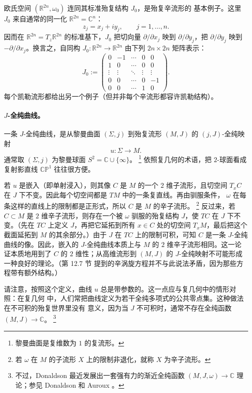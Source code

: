 欧氏空间 $(\mathbb R^{2n},\omega_0)$ 连同其标准殆复结构 $J_0$，是殆复辛流形的
基本例子。这里 $J_0$ 来自通常的同一化 $\mathbb R^{2n}=\mathbb C^n$：
\[
  z_j=x_j+iy_j,\qquad j=1,\dots,n.
\]
因而在 $\mathbb R^{2n}=T_z\mathbb R^{2n}$ 的标准基下，$J_0$ 把切向量
$\partial/\partial x_j$ 映到 $\partial/\partial y_j$，把
$\partial/\partial y_j$ 映到 $-\partial/\partial x_j$。换言之，自同构
$J_0:\mathbb R^{2n}\to\mathbb R^{2n}$ 由下列 $2n\times2n$ 矩阵表示：
\[
J_0:=
\begin{pmatrix}
0&-1&\cdots&0&0\\
1&0&\cdots&0&0\\
\vdots&\vdots&\ddots&\vdots&\vdots\\
0&0&\cdots&0&-1\\
0&0&\cdots&1&0
\end{pmatrix}.
\]
每个凯勒流形都给出另一个例子（但并非每个辛流形都容许凯勒结构）。

\paragraph{$J$-全纯曲线。}
一条 $J$-全纯曲线，是从黎曼曲面 $(\Sigma,j)$ 到殆复流形 $(M,J)$ 的
$(j,J)$-全纯映射
\[
  u:\Sigma\to M.
\]
通常取 $(\Sigma,j)$ 为黎曼球面 $S^2=\mathbb C\cup\{\infty\}$。
\footnote{黎曼曲面是复维数为 $1$ 的复流形。}
依照复几何的术语，把 $2$-球面看成复射影直线 $\mathbb{CP}^1$ 往往很方便。

若 $u$ 是嵌入（即单射浸入），则其像 $C$ 是 $M$ 的一个 $2$ 维子流形，且切空间
$T_xC$ 在 $J$ 下不变。因此每个切空间都是 $TM$ 中的一条复直线。再由驯服条件，
$\omega$ 在每条这样的直线上的限制都是正形式，所以 $C$ 是 $M$ 的辛子流形。
\footnote{若 $\omega$ 在 $M$ 的子流形 $X$ 上的限制非退化，就称 $X$ 为辛子流形。}
反过来，若 $C\subset M$ 是 $2$ 维辛子流形，则存在一个被 $\omega$ 驯服的殆复结构
$J$，使 $TC$ 在 $J$ 下不变。（先在 $TC$ 上定义 $J$，再把它延拓到所有
$x\in C$ 处的切空间 $T_xM$，最后把这个截面延拓到 $M$ 的其余部分。）由于 $J$
在 $TC$ 上的限制可积，可知 $C$ 是一条 $J$-全纯曲线的像。因此，嵌入的
$J$-全纯曲线本质上与 $M$ 的 $2$ 维辛子流形相同。这一论证本质地用到了 $C$ 的
$2$ 维性；从高维流形到 $(M,J)$ 的 $J$-全纯映射不可能形成一种良好的理论。（第 12.7 节
提到的辛涡旋方程并不与此说法矛盾，因为那些方程带有额外结构。）

请注意，按照这个定义，曲线 $u$ 总是带参数的。这一点应与复几何中的情形对照：在复几何
中，人们常把曲线定义为若干全纯多项式的公共零点集。这种做法在不可积的殆复世界里没有
意义，因为当 $J$ 不可积时，通常不存在全纯函数 $(M,J)\to\mathbb C$。
\footnote{不过，Donaldson 最近发展出一套强有力的渐近全纯函数
$(M,J,\omega)\to\mathbb C$ 理论；参见 Donaldson  和
Auroux 。}
